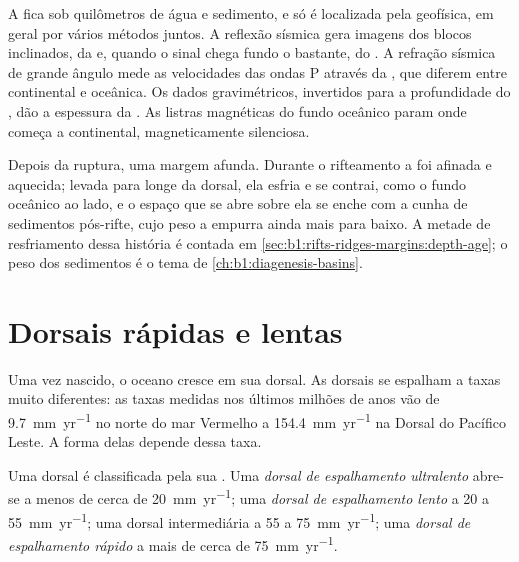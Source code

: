 \begin{inthefield}
A  fica sob quilômetros de água e sedimento, e só é localizada pela geofísica, em geral por vários métodos juntos.
A reflexão sísmica gera imagens dos blocos inclinados, da  e, quando o sinal chega fundo o bastante, do . A refração sísmica de grande ângulo mede as velocidades das ondas P através da , que diferem entre  continental e oceânica.
Os dados gravimétricos, invertidos para a profundidade do , dão a espessura da . As listras magnéticas do fundo oceânico param onde começa a  continental, magneticamente silenciosa.
\end{inthefield}

Depois da ruptura, uma margem afunda. Durante o rifteamento a  foi afinada e aquecida; levada para longe da dorsal, ela esfria e se contrai, como o fundo oceânico ao lado, e o espaço que se abre sobre ela se enche com a cunha de sedimentos pós-rifte, cujo peso a empurra ainda mais para baixo.
A metade de resfriamento dessa história é contada em \cref{sec:b1:rifts-ridges-margins:depth-age}; o peso dos sedimentos é o tema de \cref{ch:b1:diagenesis-basins}.

\section{Dorsais rápidas e lentas}

Uma vez nascido, o oceano cresce em sua dorsal. As dorsais se espalham a taxas muito diferentes: as taxas medidas nos últimos milhões de anos vão de \qty{9.7}{mm.yr^{-1}} no norte do mar Vermelho a \qty{154.4}{mm.yr^{-1}} na Dorsal do Pacífico Leste. A forma delas depende dessa taxa.

\begin{definition}\label{def:b1:rifts-ridges-margins:ridge-classes}
Uma dorsal é classificada pela sua . Uma
\emph{dorsal de espalhamento ultralento} abre-se a menos de cerca de \qty{20}{mm.yr^{-1}}; uma \emph{dorsal de espalhamento lento} a 20 a \qty{55}{mm.yr^{-1}}; uma dorsal intermediária a 55 a \qty{75}{mm.yr^{-1}}; uma \emph{dorsal de espalhamento rápido} a mais de cerca de \qty{75}{mm.yr^{-1}}.
\end{definition}

